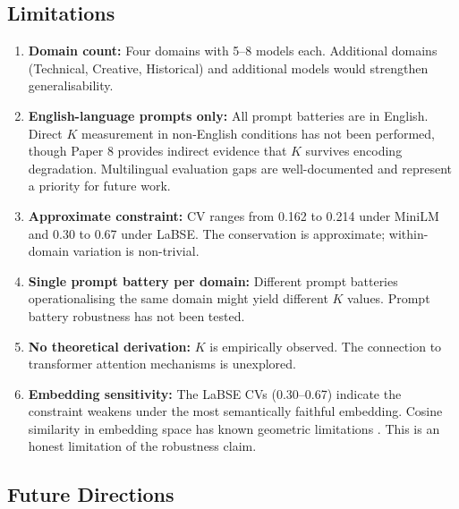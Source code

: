 \documentclass[11pt,a4paper]{article}
\begin{document}
\subsection{Limitations}

\begin{enumerate}
    \item \textbf{Domain count:} Four domains with 5--8 models each. Additional domains
    (Technical, Creative, Historical) and additional models would strengthen
    generalisability.
    \item \textbf{English-language prompts only:} All prompt batteries are in English.
    Direct $K$ measurement in non-English conditions has not been performed, though
    Paper 8 \citep{laxman2026h} provides indirect evidence that $K$ survives encoding
    degradation. Multilingual evaluation gaps are well-documented
    \citep{ahuja2023,blasi2022,lai2023chatgpt,joshi2020diversity}
    and represent a priority for future work.
    \item \textbf{Approximate constraint:} CV ranges from 0.162 to 0.214 under MiniLM
    and 0.30 to 0.67 under LaBSE. The conservation is approximate; within-domain
    variation is non-trivial.
    \item \textbf{Single prompt battery per domain:} Different prompt batteries
    operationalising the same domain might yield different $K$ values. Prompt battery
    robustness has not been tested.
    \item \textbf{No theoretical derivation:} $K$ is empirically observed. The
    connection to transformer attention mechanisms \citep{vaswani2017} is unexplored.
    \item \textbf{Embedding sensitivity:} The LaBSE CVs (0.30--0.67) indicate the
    constraint weakens under the most semantically faithful embedding. Cosine similarity
    in embedding space has known geometric limitations \citep{steck2024cosine,ethayarajh2019contextual}.
    This is an honest limitation of the robustness claim.
\end{enumerate}

\subsection{Future Directions}
\label{sec:future}
\end{document}
